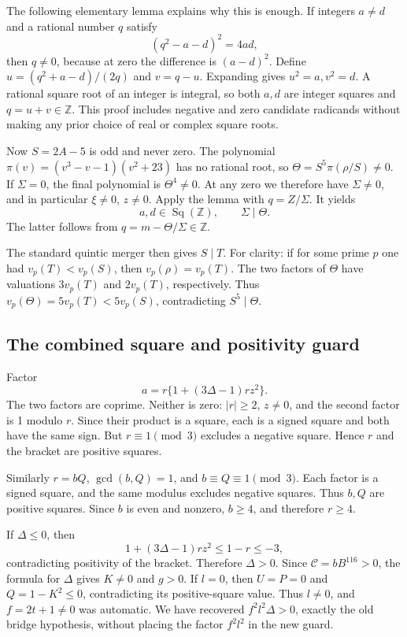 The following elementary lemma explains why this is enough. If integers
\(a\ne d\) and a rational number \(q\) satisfy \[
 (q^2-a-d)^2=4ad,
\] then \(q\ne0\), because at zero the difference is \((a-d)^2\). Define
\(u=(q^2+a-d)/(2q)\) and \(v=q-u\). Expanding gives \(u^2=a,v^2=d\). A
rational square root of an integer is integral, so both \(a,d\) are
integer squares and \(q=u+v\in\mathbb Z\). This proof includes negative
and zero candidate radicands without making any prior choice of real or
complex square roots.

Now \(S=2A-5\) is odd and never zero. The polynomial
\(\pi(v)=(v^3-v-1)(v^2+23)\) has no rational root, so
\(\Theta=S^5\pi(\rho/S)\ne0\). If \(\Sigma=0\), the final polynomial is
\(\Theta^4\ne0\). At any zero we therefore have \(\Sigma\ne0\), and in
particular \(\xi\ne0\), \(z\ne0\). Apply the lemma with \(q=Z/\Sigma\).
It yields \[
 a,d\in\operatorname{Sq}(\mathbb Z),\qquad \Sigma\mid\Theta.
\] The latter follows from \(q=m-\Theta/\Sigma\in\mathbb Z\).

The standard quintic merger then gives \(S\mid T\). For clarity: if for
some prime \(p\) one had \(v_p(T)<v_p(S)\), then \(v_p(\rho)=v_p(T)\).
The two factors of \(\Theta\) have valuations \(3v_p(T)\) and
\(2v_p(T)\), respectively. Thus \(v_p(\Theta)=5v_p(T)<5v_p(S)\),
contradicting \(S^5\mid\Theta\).

\subsection{The combined square and positivity
guard}\label{the-combined-square-and-positivity-guard}

Factor \[
 a=r\{1+(3\Delta-1)rz^2\}.
\] The two factors are coprime. Neither is zero: \(|r|\ge2\), \(z\ne0\),
and the second factor is 1 modulo \(r\). Since their product is a
square, each is a signed square and both have the same sign. But
\(r\equiv1\pmod3\) excludes a negative square. Hence \(r\) and the
bracket are positive squares.

Similarly \(r=bQ\), \(\gcd(b,Q)=1\), and \(b\equiv Q\equiv1\pmod3\).
Each factor is a signed square, and the same modulus excludes negative
squares. Thus \(b,Q\) are positive squares. Since \(b\) is even and
nonzero, \(b\ge4\), and therefore \(r\ge4\).

If \(\Delta\le0\), then \[
 1+(3\Delta-1)rz^2\le1-r\le-3,
\] contradicting positivity of the bracket. Therefore \(\Delta>0\).
Since \(\mathcal C=bB^{116}>0\), the formula for \(\Delta\) gives
\(K\ne0\) and \(g>0\). If \(l=0\), then \(U=P=0\) and \(Q=1-K^2\le0\),
contradicting its positive-square value. Thus \(l\ne0\), and
\(f=2t+1\ne0\) was automatic. We have recovered \(f^2l^2\Delta>0\),
exactly the old bridge hypothesis, without placing the factor \(f^2l^2\)
in the new guard.

